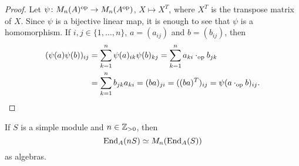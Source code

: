 \begin{proof}
	Let $\psi\colon M_n(A)^{\operatorname{op}}\to M_n(A^{\operatorname{op}})$, $X\mapsto X^T$,
	where $X^T$ is the transpose matrix of $X$. Since $\psi$ is a bijective linear map, it is enough
	to see that $\psi$ is a homomorphism. If $i,j\in\{1,\dots,n\}$, $a=(a_{ij})$ and $b=(b_{ij})$, then 
	\begin{align*}
		(\psi(a)\psi(b))_{ij}&=\sum_{k=1}^n \psi(a)_{ik}\psi(b)_{kj}=\sum_{k=1}^n a_{ki}\cdot_{\operatorname{op}}b_{jk}\\
		&=\sum_{k=1}^n b_{jk}a_{ki}=(ba)_{ji}=((ba)^T)_{ij}=\psi(a\cdot_{\operatorname{op}}b)_{ij}.\qedhere
	\end{align*}
\end{proof}

\begin{lemma}
	\label{lem:simple}
	If $S$ is a simple module and $n\in\mathbb{Z}_{>0}$, then  
	\[
		\operatorname{End}_A(nS)\simeq M_n(\operatorname{End}_A(S))
	\]
	as algebras.
\end{lemma}

